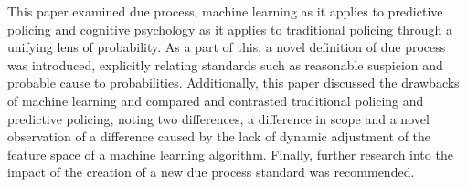 \documentclass[12pt]{article} %
\begin{document}
This paper examined due process, machine learning as it applies to predictive policing and cognitive psychology as it applies to traditional policing through a unifying lens of probability. As a part of this, a novel definition of due process was introduced, explicitly relating standards such as reasonable suspicion and probable cause to probabilities. Additionally, this paper discussed the drawbacks of machine learning and compared and contrasted traditional policing and predictive policing, noting two differences, a difference in scope and a novel observation of a difference caused by the lack of dynamic adjustment of the feature space of a machine learning algorithm. Finally, further research into the impact of the creation of a new due process standard was recommended. 
\newpage




\end{document}
